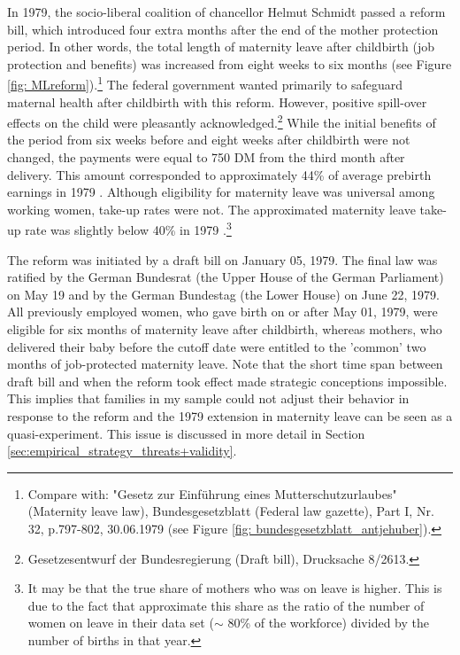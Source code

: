 \documentclass[11pt, a4paper]{article} %
\begin{document}
In 1979, the socio-liberal coalition of chancellor Helmut Schmidt passed a reform bill, which introduced four extra months after the end of the mother protection period. In other words, the total length of maternity leave after childbirth (job protection and benefits) was increased from eight weeks to six months (see Figure \ref{fig: MLreform}).\footnote{Compare with: "Gesetz zur Einführung eines Mutterschutzurlaubes" (Maternity leave law), Bundesgesetzblatt (Federal law gazette), Part I, Nr. 32, p.797-802, 30.06.1979 (see Figure \ref{fig: bundesgesetzblatt_antjehuber}).} The federal government wanted primarily to safeguard maternal health after childbirth with this reform. However, positive spill-over effects on the child were pleasantly acknowledged.\footnote{Gesetzesentwurf der Bundesregierung (Draft bill), Drucksache 8/2613.} While the initial benefits of the period from six weeks before and eight weeks after childbirth were not changed, the payments were equal to 750 DM from the third month after delivery. This amount corresponded to approximately 44\% of average prebirth earnings in 1979 \citep{schonberg2014expansions}. Although eligibility for maternity leave was universal among working women, take-up rates were not. The approximated maternity leave take-up rate was slightly below 40\% in 1979 \citep{Dustmann2012}.\footnote{It may be that the true share of mothers who was on leave is higher. This is due to the fact that \cite{Dustmann2012} approximate this share as the ratio of the number of women on leave in their data set ($\sim$ 80\% of the workforce) divided by the number of births in that year.}
\newline

The reform was initiated by a draft bill on January 05, 1979. The final law was ratified by the German Bundesrat (the Upper House of the German Parliament) on May 19 and by the German Bundestag (the Lower House) on June 22, 1979.  All previously employed women, who gave birth on or after May 01, 1979, were eligible for six months of maternity leave after childbirth, whereas mothers, who delivered their baby before the cutoff date were entitled to the 'common' two months of job-protected maternity leave. Note that the short time span between draft bill and when the reform took effect made strategic conceptions impossible. This implies that families in my sample could not adjust their behavior in response to the reform and the 1979 extension in maternity leave can be seen as a quasi-experiment. This issue is discussed in more detail in Section \ref{sec:empirical_strategy_threats+validity}.\newline
\end{document}
